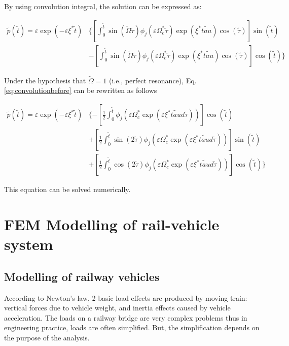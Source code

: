 By using convolution integral, the solution can be expressed as:

\begin{equation}
	\label{eq:convolutionbefore}
	\begin{split}
		\tilde{p}(\tilde{t})=\varepsilon \exp (-\varepsilon \xi^* \tilde{t}) & \{ [\int_0^{\tilde{t}} \sin (\tilde{\Omega}\tilde{\tau})\phi_j(\varepsilon\Omega_c^* \tilde{\tau}) \exp (\xi^* \tilde{tau}) \cos(\tilde{\tau})]\sin(\tilde{t}) \\ 
		& -[\int_0^{\tilde{t}} \sin (\tilde{\Omega}\tilde{\tau})\phi_j(\varepsilon\Omega_c^* \tilde{\tau}) \exp (\xi^* \tilde{tau}) \cos(\tilde{\tau})]\cos(\tilde{t})\}
	\end{split}
\end{equation}

Under the hypothesis that $\tilde{\Omega} = 1$ (i.e., perfect resonance), Eq.\ref{eq:convolutionbefore} can be rewritten as follows

\begin{equation}
	\begin{split}
		\tilde{p}(\tilde{t})=\varepsilon \exp (-\varepsilon \xi^* \tilde{t}) & \{-[\frac{1}{2}\int_0^{\tilde{t}}\phi_j (\varepsilon \Omega_c^* \exp (\varepsilon \xi^* \tilde{tau}d\tilde{\tau}))]\cos (\tilde{t}) \\
		& +[\frac{1}{2}\int_0^{\tilde{t}}\sin(2\tilde{\tau})\phi_j (\varepsilon \Omega_c^* \exp (\varepsilon \xi^* \tilde{tau}d\tilde{\tau}))]\sin (\tilde{t}) \\
		& +[\frac{1}{2}\int_0^{\tilde{t}}\cos(2\tilde{\tau})\phi_j (\varepsilon \Omega_c^* \exp (\varepsilon \xi^* \tilde{tau}d\tilde{\tau}))]\cos (\tilde{t})\}
	\end{split}
\end{equation}

This equation can be solved numerically.


\section{FEM Modelling of rail-vehicle system}

\subsection{Modelling of railway vehicles}
According to Newton's law, 2 basic load effects are produced by moving train: vertical forces due to vehicle weight, and inertia effects caused by vehicle acceleration. The loads on a railway bridge are very complex problems thus in engineering practice, loads are often simplified. But, the simplification depends on the purpose of the analysis. 

